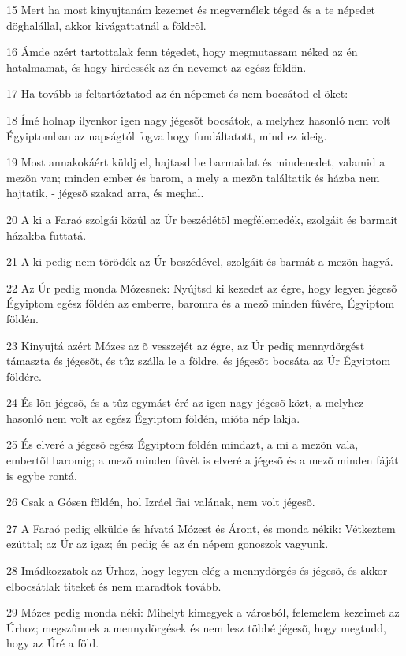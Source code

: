 \par 15 Mert ha most kinyujtanám kezemet és megvernélek téged és a te népedet döghalállal, akkor kivágattatnál a földrõl.
\par 16 Ámde azért tartottalak fenn tégedet, hogy megmutassam néked az én hatalmamat, és hogy hirdessék az én nevemet az egész földön.
\par 17 Ha tovább is feltartóztatod az én népemet és nem bocsátod el õket:
\par 18 Ímé holnap ilyenkor igen nagy jégesõt bocsátok, a melyhez hasonló nem volt Égyiptomban az napságtól fogva hogy fundáltatott, mind ez ideig.
\par 19 Most annakokáért küldj el, hajtasd be barmaidat és mindenedet, valamid a mezõn van; minden ember és barom, a mely a mezõn találtatik és házba nem hajtatik, - jégesõ szakad arra, és meghal.
\par 20 A ki a Faraó szolgái közûl az Úr beszédétõl megfélemedék, szolgáit és barmait házakba futtatá.
\par 21 A ki pedig nem törõdék az Úr beszédével, szolgáit és barmát a mezõn hagyá.
\par 22 Az Úr pedig monda Mózesnek: Nyújtsd ki kezedet az égre, hogy legyen jégesõ Égyiptom egész földén az emberre, baromra és a mezõ minden fûvére, Égyiptom földén.
\par 23 Kinyujtá azért Mózes az õ vesszejét az égre, az Úr pedig mennydörgést támaszta és jégesõt, és tûz szálla le a földre, és jégesõt bocsáta az Úr Égyiptom földére.
\par 24 És lõn jégesõ, és a tûz egymást éré az igen nagy jégesõ közt, a melyhez hasonló nem volt az egész Égyiptom földén, mióta nép lakja.
\par 25 És elveré a jégesõ egész Égyiptom földén mindazt, a mi a mezõn vala, embertõl baromig; a mezõ minden fûvét is elveré a jégesõ és a mezõ minden fáját is egybe rontá.
\par 26 Csak a Gósen földén, hol Izráel fiai valának, nem volt jégesõ.
\par 27 A Faraó pedig elkülde és hívatá Mózest és Áront, és monda nékik: Vétkeztem ezúttal; az Úr az igaz; én pedig és az én népem gonoszok vagyunk.
\par 28 Imádkozzatok az Úrhoz, hogy legyen elég a mennydörgés és jégesõ, és akkor elbocsátlak titeket és nem maradtok tovább.
\par 29 Mózes pedig monda néki: Mihelyt kimegyek a városból, felemelem kezeimet az Úrhoz; megszûnnek a mennydörgések és nem lesz többé jégesõ, hogy megtudd, hogy az Úré a föld.
